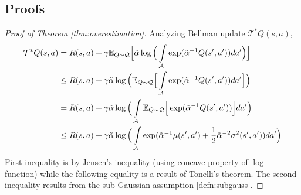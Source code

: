 \documentclass[10pt]{article} %
\begin{document}
\begin{appendices}
	
	\section{Proofs}
	\label{app:proofs}

\begin{proof}[Proof of Theorem \ref{thm:overestimation}]
	Analyzing Bellman update $\mathcal{T}^{*} Q(s,a)$, 
	\begin{align*}
		\mathcal{T}^{*} Q(s,a) &= R(s,a) + \gamma \mathbb{E}_{Q\sim \mathcal{Q}} \Big[ \Tilde{\alpha} \log \Big( \int\limits_{\mathcal{A}} \exp({\Tilde{\alpha}}^{-1} Q(s',a')) da' \Big) \Big] \\
		&\leq R(s,a) + \gamma \Tilde{\alpha} \log \Big( \mathbb{E}_{Q\sim \mathcal{Q}} \Big[ \int\limits_{\mathcal{A}} \exp({\Tilde{\alpha}}^{-1} Q(s',a')) da'  \Big] \Big) \\
		&= R(s,a) + \gamma \Tilde{\alpha} \log \Big( \int\limits_{\mathcal{A}} \mathbb{E}_{Q\sim \mathcal{Q}} \Big[ \exp({\Tilde{\alpha}}^{-1} Q(s',a')) \Big] da' \Big) \\
		&\leq R(s,a) + \gamma \Tilde{\alpha} \log \Big( \int\limits_{\mathcal{A}} \exp( {\Tilde{\alpha}}^{-1} \mu(s',a') + \frac{1}{2} {\Tilde{\alpha}}^{-2} \sigma^2(s',a') ) da' \Big) \\
	\end{align*}
	First inequality is by Jensen's inequality (using concave property of $\log$ function) while the following equality is a result of Tonelli's theorem. The second inequality results from the sub-Gaussian assumption \ref{defn:subgauss}. 
\end{proof} 


\end{appendices}
\end{document}
